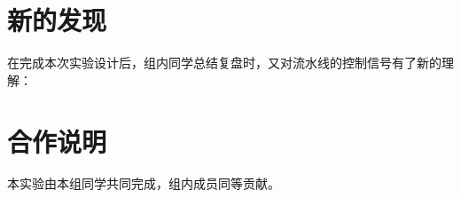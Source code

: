 \documentclass[11pt]{article}
\begin{document}


\section{新的发现}
在完成本次实验设计后，组内同学总结复盘时，又对流水线的控制信号有了新的理解：




\section{合作说明}

本实验由本组同学共同完成，组内成员同等贡献。
\end{document}
